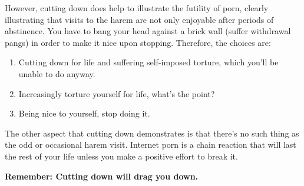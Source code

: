 \documentclass[easypeasy.tex]{subfiles}
\begin{document}
However, cutting down does help to illustrate the futility of porn, clearly illustrating that visits to the harem are not only enjoyable after periods of abstinence. You have to bang your head against a brick wall (suffer withdrawal pangs) in order to make it nice upon stopping. Therefore, the choices are:
\begin{enumerate}
  \item Cutting down for life and suffering self-imposed torture, which you'll be unable to do anyway.
  \item Increasingly torture yourself for life, what's the point?
  \item Being nice to yourself, stop doing it.
\end{enumerate}
The other aspect that cutting down demonstrates is that there's no such thing as the odd or occasional harem visit. Internet porn is a chain reaction that will last the rest of your life unless you make a positive effort to break it.

\textbf{Remember: Cutting down will drag you down.}
\end{document}
